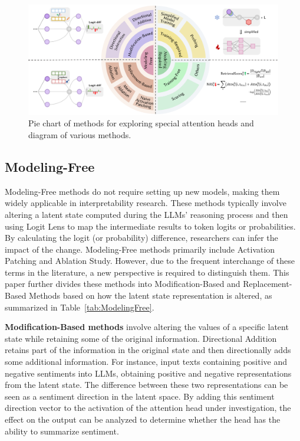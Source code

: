 \documentclass{article}
\begin{document}
\begin{figure}[htbp]
    \centering
    \includegraphics[width=\linewidth]{figures/piechart.pdf}
    \caption{Pie chart of methods for exploring special attention heads and diagram of various methods.}
    \label{fig:piechart}
\end{figure}


\subsection{Modeling-Free} \label{subsec:ModelFree}

Modeling-Free methods do not require setting up new models, making them widely applicable in interpretability research. These methods typically involve altering a latent state computed during the LLMs' reasoning process and then using Logit Lens to map the intermediate results to token logits or probabilities. By calculating the logit (or probability) difference, researchers can infer the impact of the change. Modeling-Free methods primarily include Activation Patching and Ablation Study. However, due to the frequent interchange of these terms in the literature, a new perspective is required to distinguish them. This paper further divides these methods into Modification-Based and Replacement-Based Methods based on how the latent state representation is altered, as summarized in Table~\ref{tab:ModelingFree}.

\textbf{Modification-Based methods} involve altering the values of a specific latent state while retaining some of the original information.
Directional Addition retains part of the information in the original state and then directionally adds some additional information. For instance, \citet{Sentiment_23_arXiv_EleutherAI} input texts containing positive and negative sentiments into LLMs, obtaining positive and negative representations from the latent state. The difference between these two representations can be seen as a sentiment direction in the latent space. By adding this sentiment direction vector to the activation of the attention head under investigation, the effect on the output can be analyzed to determine whether the head has the ability to summarize sentiment.
\end{document}
